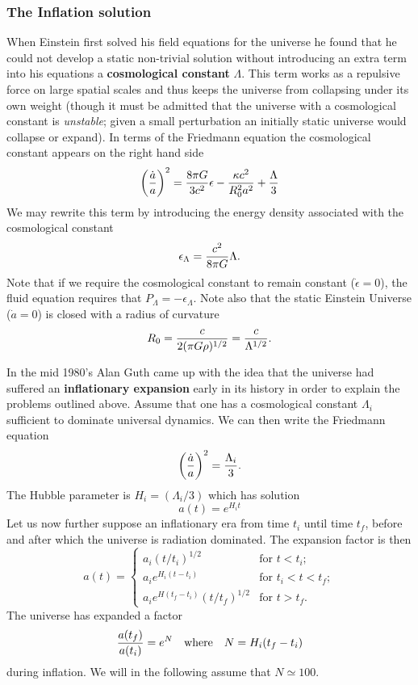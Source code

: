 \documentclass{article}
\begin{document}
\subsubsection*{The Inflation solution}
When Einstein first solved his field equations for the universe he found that he could not develop a static non-trivial solution without
introducing an extra term into his equations a {\bf cosmological constant} $\Lambda$. This term works as a repulsive force on large spatial
scales and thus keeps the universe from collapsing under its own weight (though it must be admitted that the universe with a cosmological
constant is {\it unstable}; given a small perturbation an initially static universe would collapse or expand). In terms of the Friedmann
equation the cosmological constant appears on the right hand side
\[ \left({\dot{a}\over a}\right)^2={8\pi G\over 3c^2}\epsilon-{\kappa c^2\over R_0^2a^2}+{\Lambda\over 3} \]
We may rewrite this term by introducing the energy density associated with the cosmological constant
\[ \epsilon_\Lambda={c^2\over 8\pi G}\Lambda. \]
Note that if we require the cosmological constant to remain constant ($\dot{\epsilon}=0$), the fluid equation requires that 
$P_\Lambda=-\epsilon_\Lambda$. Note also that the static Einstein Universe ($\dot{a}=0$) is closed with a radius of curvature 
\[ R_0={c\over 2(\pi G\rho)^{1/2}}={c\over\Lambda^{1/2}}. \]
\par
In the mid 1980's Alan Guth came up with the idea that the universe had suffered an {\bf inflationary expansion} early in its history in 
order to explain the problems outlined above. Assume that one has a cosmological constant $\Lambda_i$ sufficient to dominate universal 
dynamics. We can then write the Friedmann equation
\[ \left({\dot{a}\over a}\right)^2={\Lambda_i\over 3}. \]
The Hubble parameter is $H_i=({\Lambda_i/3})$ which has solution
\[ a(t)=e^{H_it} \]
Let us now further suppose an inflationary era from time $t_i$ until time $t_f$, before and after which the universe is radiation dominated. 
The expansion factor is then
\[ a(t) =\left\{ \begin{array}{ll}
             a_i(t/t_i)^{1/2} & \mbox{for $t<t_i$}; \\
             a_ie^{H_i(t-t_i)} & \mbox{for $t_i<t<t_f$}; \\
             a_ie^{H(t_f-t_i)}(t/t_f)^{1/2} & \mbox{for $t>t_f$}.\end{array}\right. \]
The universe has expanded a factor
\[ {a(t_f)\over a(t_i)}=e^{N} \quad {\rm where} \quad N=H_i(t_f-t_i) \]
during inflation. We will in the following assume that $N\simeq 100$.
\end{document}
